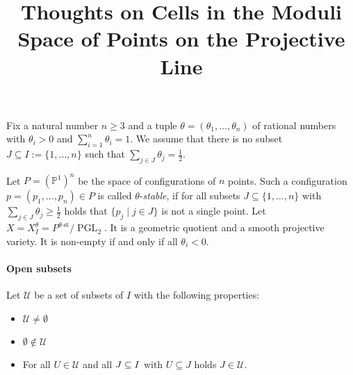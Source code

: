 \documentclass[11pt, a4paper]{amsart}
\title{Thoughts on Cells in the Moduli Space of Points on the Projective Line}
\author{}
\date{}
\begin{document}
	\maketitle
	
	Fix a natural number $n \geq 3$ and a tuple $\theta = (\theta_1,\ldots,\theta_n)$ of rational numbers with $\theta_i > 0$ and $\sum_{i=1}^n \theta_i = 1$. 
	We assume that there is no subset $J \subseteq I := \{1,\ldots,n\}$ such that $\sum_{j \in J} \theta_j = \frac{1}{2}$.

	Let $P = (\mathbb{P}^1)^n$ be the space of configurations of $n$ points. 
	Such a configuration $p = (p_1,\ldots,p_n) \in P$ is called $\theta$-\emph{stable}, if for all subsets $J \subseteq \{1,\ldots,n\}$ with $\sum_{j \in J} \theta_j \geq \frac{1}{2}$ holds that $\{p_j \mid j \in J\}$ is not a single point.
	Let $X = X_I^\theta = P^{\theta\text{-st}}/\operatorname{PGL}_2$. It is a geometric quotient and a smooth projective variety. 
	It is non-empty if and only if all $\theta_i < 0$.

	\paragraph{Open subsets}
	Let $\mathcal{U}$ be a set of subsets of $I$ with the following properties:
	\begin{itemize}
		\item $\mathcal{U} \neq \emptyset$
		\item $\emptyset \notin \mathcal{U}$
		\item For all $U \in \mathcal{U}$ and all $J \subseteq I$ with $U \subseteq J$ holds $J \in \mathcal{U}$.
	\end{itemize}
\end{document}
